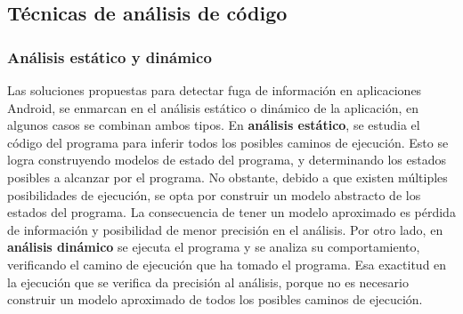 \subsection{Técnicas de análisis de código}
\label{subsec:contexto}
\subsubsection{Análisis estático y dinámico}

Las soluciones propuestas para detectar fuga de información en aplicaciones
Android, se enmarcan en el análisis estático o dinámico de la aplicación, en
algunos casos se combinan ambos tipos.\newline 
En \textbf{análisis estático}\cite{Static-dynamic}, se estudia el código del
programa para inferir todos los posibles caminos de ejecución. Esto se logra
construyendo modelos de estado del programa, y determinando los estados posibles
a alcanzar por el programa.
No obstante, debido a que existen múltiples posibilidades de ejecución, se opta
por construir un modelo abstracto de los estados del programa. La consecuencia
de tener un modelo aproximado es pérdida de información y posibilidad de menor
precisión en el análisis.\newline 
Por otro lado, en \textbf{análisis dinámico} se ejecuta el programa y se analiza
su comportamiento, verificando el camino de ejecución que ha tomado el programa.
Esa exactitud en la ejecución que se verifica da precisión al análisis, porque
no es necesario construir un modelo aproximado de todos los posibles caminos de
ejecución.

